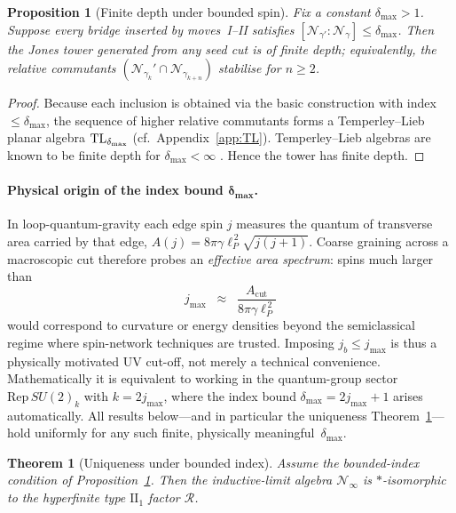 \documentclass[11pt]{article}
\newtheorem{theorem}{Theorem}[section]
\newtheorem{proposition}{Proposition}[section]
\begin{document}
\begin{proposition}[Finite depth under bounded spin]\label{prop:finitedepth}
Fix a constant $\delta_{\max}\!>\!1$.  
Suppose every bridge inserted by moves~I–II satisfies 
$[\mathcal N_{\gamma'}:\mathcal N_{\gamma}]\le \delta_{\max}$.  
Then the Jones tower generated from any seed cut is of finite depth; 
equivalently, the relative commutants 
$(\mathcal N_{\gamma_k}'\!\cap\mathcal N_{\gamma_{k+n}})$ stabilise for $n\ge 2$.
\end{proposition}

\begin{proof}
Because each inclusion is obtained via the basic construction with
index $\le\delta_{\max}$, the sequence of higher relative commutants
forms a Temperley--Lieb planar algebra ${\rm TL}_{\delta_{\max}}$
(cf.\ Appendix~\ref{app:TL}).  
Temperley--Lieb algebras are known to be finite depth for 
$\delta_{\max}\!<\!\infty$ \cite[Prop.~2.2]{JonesTL}.  Hence the tower
has finite depth.
\end{proof}

\paragraph{Physical origin of the index bound $\boldsymbol{\delta_{\max}}$.}
In loop-quantum-gravity each edge spin \(j\) measures the quantum of
transverse area carried by that edge, 
\(A(j)=8\pi\gamma \ell_{\!P}^{\,2}\sqrt{j(j+1)}\).
Coarse graining across a macroscopic cut therefore probes an \emph{effective
area spectrum}: spins much larger than
\[
  j_{\mathrm{max}}
  \;\;\approx\;\;
  \frac{A_{\mathrm{cut}}}{8\pi\gamma\ell_{\!P}^{\,2}}
\]
would correspond to curvature or energy densities beyond the
semiclassical regime where spin-network techniques are trusted.
Imposing \(j_b\le j_{\mathrm{max}}\) is thus a physically motivated UV
cut-off, not merely a technical convenience.  Mathematically it is
equivalent to working in the quantum-group sector
\(\mathrm{Rep}\,SU(2)_k\) with
\(k=2 j_{\mathrm{max}}\), where the index bound
\(\delta_{\max}=2j_{\mathrm{max}}+1\) arises automatically.  All results
below—and in particular the uniqueness
Theorem~\ref{thm:unique}—hold uniformly for any such finite, physically
meaningful~\(\delta_{\max}\).


\begin{theorem}[Uniqueness under bounded index]\label{thm:unique}
Assume the bounded-index condition of Proposition~\ref{prop:finitedepth}.
Then the inductive-limit algebra $\mathcal N_{\infty}$ is
$*$-isomorphic to the hyperfinite type $\mathrm{II}_1$ factor
$\mathcal R$.
\end{theorem}
\end{document}
